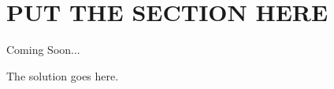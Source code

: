 \documentclass[a4paper, 10pt]{article}
\begin{document}
\subject[2110203 - Computer Engineering Mathematics II]


\section{PUT THE SECTION HERE}



\begin{problem}
Coming Soon...
\end{problem}

\begin{solution}
The solution goes here.
\end{solution}
\end{document}
